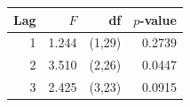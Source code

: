 \begin{tabular}{rrrr}
\toprule
Lag & $F$ & df & $p$-value \\
\midrule
1 & 1.244 & (1,29) & 0.2739 \\
2 & 3.510 & (2,26) & 0.0447 \\
3 & 2.425 & (3,23) & 0.0915 \\
\bottomrule
\end{tabular}
